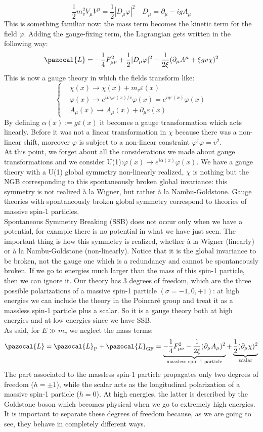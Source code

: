 \documentclass[../main.tex]{subfiles}
\begin{document}
\[
\frac{1}{2}m_v^2V_\mu V^\mu=\frac{1}{2}|D_\mu\varphi|^2 \quad D_\mu=\partial_\mu-igA_\mu
\]
This is something familiar now: the mass term becomes the kinetic term for the field $\varphi$. Adding the gauge-fixing term, the Lagrangian gets written in the following way:
\[
\pazocal{L}=-\frac{1}{4}F_{\mu\nu}^2+\frac{1}{2}|D_\mu\varphi|^2-\frac{1}{2\xi}(\partial_\mu A^\mu+\xi gv\chi)^2
\]
This is now a gauge theory in which the fields transform like:
\[
\left\{
\begin{aligned}
&\chi(x)\to\chi(x)+m_v\varepsilon(x)\\
&\varphi(x)\to e^{im_v\varepsilon(x)/v}\varphi(x)=e^{ig\varepsilon(x)}\varphi(x)\\
&A_\mu(x)\to A_\mu(x)+\partial_\mu\varepsilon(x)
\end{aligned}
\right.
\]
By defining $\alpha(x):=g\varepsilon(x)$ it becomes a gauge transformation which acts linearly. Before it was not a linear transformation in $\chi$ because there was a non-linear shift, moreover $\varphi$ is subject to a non-linear constraint $\varphi^\dagger\varphi=v^2$.\\
At this point, we forget about all the considerations we made about gauge transformations and we consider U(1):$\varphi(x)\to e^{i\alpha(x)}\varphi(x)$. We have a gauge theory with a U(1) global symmetry non-linearly realized, $\chi$ is nothing but the NGB corresponding to this spontaneously broken global invariance: this symmetry is not realized à la Wigner, but rather à la Nambu-Goldstone. Gauge theories with spontaneously broken global symmetry correspond to theories of massive spin-1 particles.\\
Spontaneous Symmetry Breaking (SSB) does not occur only when we have a potential, for example there is no potential in what we have just seen. The important thing is how this symmetry is realized, whether à la Wigner (linearly) or à la Nambu-Goldstone (non-linearly). Notice that it is the global invariance to be broken, not the gauge one which is a redundancy and cannot be spontaneously broken. If we go to energies much larger than the mass of this spin-1 particle, then we can ignore it. Our theory has 3 degrees of freedom, which are the three possible polarizations of a massive spin-1 particle $(\sigma=-1,0,+1)$: at high energies we can include the theory in the Poincaré group and treat it as a massless spin-1 particle plus a scalar. So it is a gauge theory both at high energies and at low energies since we have SSB.\\
As said, for $E\gg m_v$ we neglect the mass terms:
\[
\pazocal{L}=\pazocal{L}_{\text{P}}+\pazocal{L}_{\text{GF}}=\underbrace{-\frac{1}{4}F_{\mu\nu}^2-\frac{1}{2\xi}(\partial_\mu A_\mu)^2}_{\text{massless spin-1 particle}}+\underbrace{\frac{1}{2}(\partial_\mu \chi)^2}_{\text{scalar}}
\]
The part associated to the massless spin-1 particle propagates only two degrees of freedom ($h=\pm1$), while the scalar acts as the longitudinal polarization of a massive spin-1 particle ($h=0$). At high energies, the latter is described by the Goldstone boson which becomes physical when we go to extremely high energies. It is important to separate these degrees of freedom because, as we are going to see, they behave in completely different ways.
\end{document}
